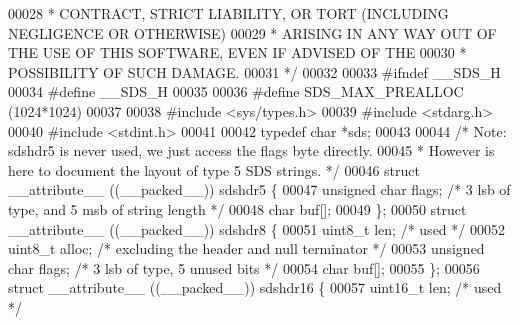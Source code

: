 \begin{DoxyCode}
00028 \textcolor{comment}{ * CONTRACT, STRICT LIABILITY, OR TORT (INCLUDING NEGLIGENCE OR OTHERWISE)}
00029 \textcolor{comment}{ * ARISING IN ANY WAY OUT OF THE USE OF THIS SOFTWARE, EVEN IF ADVISED OF THE}
00030 \textcolor{comment}{ * POSSIBILITY OF SUCH DAMAGE.}
00031 \textcolor{comment}{ */}
00032 
00033 \textcolor{preprocessor}{#}\textcolor{preprocessor}{ifndef} \textcolor{preprocessor}{\_\_SDS\_H}
00034 \textcolor{preprocessor}{#}\textcolor{preprocessor}{define} \textcolor{preprocessor}{\_\_SDS\_H}
00035 
00036 \textcolor{preprocessor}{#}\textcolor{preprocessor}{define} \textcolor{preprocessor}{SDS\_MAX\_PREALLOC} \textcolor{preprocessor}{(}1024\textcolor{preprocessor}{*}1024\textcolor{preprocessor}{)}
00037 
00038 \textcolor{preprocessor}{#}\textcolor{preprocessor}{include} \textcolor{preprocessor}{<}\textcolor{preprocessor}{sys}\textcolor{preprocessor}{/}\textcolor{preprocessor}{types}\textcolor{preprocessor}{.}\textcolor{preprocessor}{h}\textcolor{preprocessor}{>}
00039 \textcolor{preprocessor}{#}\textcolor{preprocessor}{include} \textcolor{preprocessor}{<}\textcolor{preprocessor}{stdarg}\textcolor{preprocessor}{.}\textcolor{preprocessor}{h}\textcolor{preprocessor}{>}
00040 \textcolor{preprocessor}{#}\textcolor{preprocessor}{include} \textcolor{preprocessor}{<}\textcolor{preprocessor}{stdint}\textcolor{preprocessor}{.}\textcolor{preprocessor}{h}\textcolor{preprocessor}{>}
00041 
00042 \textcolor{keyword}{typedef} \textcolor{keywordtype}{char} *sds;
00043 
00044 \textcolor{comment}{/* Note: sdshdr5 is never used, we just access the flags byte directly.}
00045 \textcolor{comment}{ * However is here to document the layout of type 5 SDS strings. */}
00046 \textcolor{keyword}{struct} \textcolor{keyword}{\_\_attribute\_\_} ((\_\_packed\_\_)) sdshdr5 \{
00047     \textcolor{keywordtype}{unsigned} \textcolor{keywordtype}{char} flags; \textcolor{comment}{/* 3 lsb of type, and 5 msb of string length */}
00048     \textcolor{keywordtype}{char} buf[];
00049 \};
00050 \textcolor{keyword}{struct} \textcolor{keyword}{\_\_attribute\_\_} ((\_\_packed\_\_)) sdshdr8 \{
00051     uint8\_t len; \textcolor{comment}{/* used */}
00052     uint8\_t alloc; \textcolor{comment}{/* excluding the header and null terminator */}
00053     \textcolor{keywordtype}{unsigned} \textcolor{keywordtype}{char} flags; \textcolor{comment}{/* 3 lsb of type, 5 unused bits */}
00054     \textcolor{keywordtype}{char} buf[];
00055 \};
00056 \textcolor{keyword}{struct} \textcolor{keyword}{\_\_attribute\_\_} ((\_\_packed\_\_)) sdshdr16 \{
00057     uint16\_t len; \textcolor{comment}{/* used */}

\end{DoxyCode}
